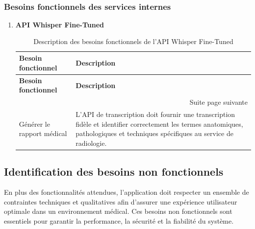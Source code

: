 \documentclass[12pt,a4paper]{report}
\begin{document}
\subsubsection{Besoins fonctionnels des services internes}
\begin{enumerate}[label=\Alph*.]
    \item \textbf{API Whisper Fine-Tuned}

    \begin{longtable}{|p{5cm}|p{10cm}|}
\caption{Description des besoins fonctionnels de l'API Whisper Fine-Tuned} \\
\hline
\textbf{Besoin fonctionnel} & \textbf{Description} \\
\hline
\endfirsthead
\hline
\textbf{Besoin fonctionnel} & \textbf{Description} \\
\hline
\endhead
\hline
\multicolumn{2}{|r|}{{Suite page suivante}} \\
\hline
\endfoot
\hline
\endlastfoot
Générer le rapport médical &
L'API de transcription doit fournir une transcription fidèle et identifier correctement les termes anatomiques, pathologiques et techniques spécifiques au service de radiologie. \\
\hline
\end{longtable}
\end{enumerate}


\subsection{Identification des besoins non fonctionnels}
En plus des fonctionnalités attendues, l'application doit respecter un ensemble de contraintes techniques et qualitatives afin d'assurer une expérience utilisateur optimale dans un environnement médical. Ces besoins non fonctionnels sont essentiels pour garantir la performance, la sécurité et la fiabilité du système.
\end{document}
